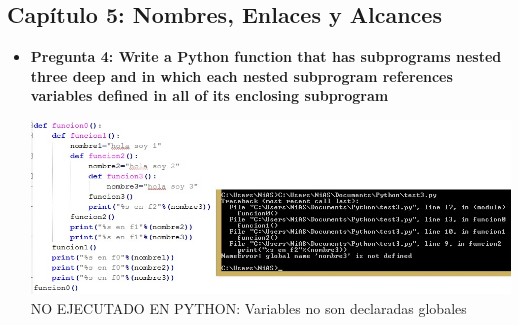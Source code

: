 \documentclass[12pt,oneside]{article}
\begin{document}
		\subsection{Capítulo 5: Nombres, Enlaces y Alcances}
			\begin{itemize}
				\item {\bf Pregunta 4: Write a Python function that has subprograms nested three deep and in which each nested subprogram references variables defined in all of its enclosing subprogram}	
					\begin{center}
						\includegraphics[scale=0.5]{Imagenes/6.jpg}\\
						NO EJECUTADO EN PYTHON: Variables no son declaradas globales
					\end{center}


\end{itemize}
\end{document}
